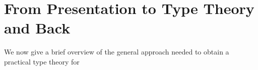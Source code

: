 \documentclass[pra,floatfix,
amsmath,superscriptaddress, 12pt]{article}
\theoremstyle{definition}
\newtheorem*{lem*}{Lemma}
\newcommand{\mc}[1]{\mathcal{#1}}
\begin{document}






\section{From Presentation to Type Theory and Back}


We now give a brief overview of the general approach needed to obtain a practical type theory for 
\end{document}
